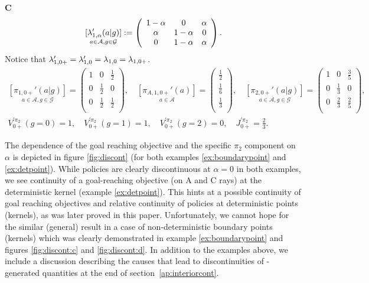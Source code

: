 \begin{example}
\vspace{1em}
\noindent{}\textbf{C}
$$
\underset{a\in \mathcal{A}, g \in \mathcal{G}}{[\mathit{\lambda}_{1,\alpha}'(a|g)]} :=
\left(
\begin{array}{ccc}
1-\alpha & 0            & \alpha \\
\alpha   & 1-\alpha  & 0  \\
0        & 1-\alpha  & \alpha \\
\end{array}
\right).
$$
Notice that $\mathit{\lambda}_{1,0+}' = \mathit{\lambda}_{1,0}' = \mathit{\lambda}_{1,0} = \mathit{\lambda}_{1,0+}$.
$$
\begin{gathered}
\underset{a\in \mathcal{A}, g \in \mathcal{G}}{[\pi_{1,0+}'(a|g)]} =
\left(
\begin{array}{ccc}
1 & 0            & \frac{1}{2} \\
0 & \frac{1}{2}  & 0  \\
0 & \frac{1}{2}  & \frac{1}{2} \\
\end{array}
\right)
,\quad
\underset{a\in \mathcal{A}}{[\pi_{A,1,0+}'(a)]} =
\left(
\begin{array}{c}
\frac{1}{2} \\
\frac{1}{6} \\
\frac{1}{3}  \\
\end{array}
\right)
,\quad
\underset{a\in \mathcal{A},g\in \mathcal{G}}{[\pi_{2,0+}'(a|g)]} =
\left(
\begin{array}{ccc}
1 & 0           & \frac{3}{5} \\
0 & \frac{1}{3} & 0 \\
0 & \frac{2}{3} & \frac{2}{5}  \\
\end{array}
\right)
,\\
V_{0+}^{'\pi_2}(g=0) = 1,\quad
V_{0+}^{'\pi_2}(g=1) = 1,\quad
V_{0+}^{'\pi_2}(g=2) = 0,\quad
J_{0+}^{'\pi_2} = \frac{2}{3}.
\end{gathered}
$$
\end{example}
The dependence of the goal reaching objective and the specific 
$\pi_2$ component on $\alpha$ is depicted in figure \ref{fig:discont}
(for both examples \ref{ex:boundarypoint} and \ref{ex:detpoint}).
While policies are clearly discontinuous at $\alpha = 0$ in both
examples, we see continuity of a goal-reaching objective (on A and C rays) at the deterministic kernel
(example \ref{ex:detpoint}). This hints at a possible 
continuity of goal reaching objectives and relative continuity
of policies at deterministic points (kernels), as was later 
proved in this paper. Unfortunately, we cannot hope for
the similar (general) result in a case of non-deterministic boundary points (kernels) which was clearly demonstrated in example \ref{ex:boundarypoint} and figures \ref{fig:discont:c} and \ref{fig:discont:d}. In addition to the examples above, we include a discussion describing the causes that lead to discontinuities of \eUDRL{}-generated quantities at the end of section~\ref{ap:interiorcont}. 


